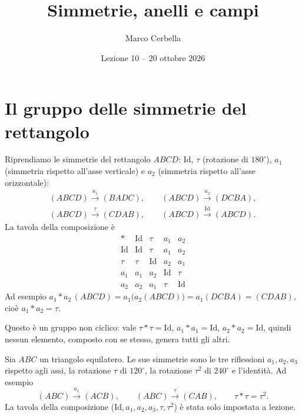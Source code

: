 \documentclass[11pt,a4paper]{article}
\title{Simmetrie, anelli e campi}
\author{Marco Cerbella}
\date{Lezione 10 -- 20 ottobre 2026}
\begin{document}
\maketitle

\section{Il gruppo delle simmetrie del rettangolo}

Riprendiamo le simmetrie del rettangolo $ABCD$: $\mathrm{Id}$, $\tau$ (rotazione di $180^\circ$), $a_1$ (simmetria rispetto all'asse verticale) e $a_2$ (simmetria rispetto all'asse orizzontale):
\[
  \begin{gathered}
  (ABCD) \xrightarrow{a_1} (BADC), \qquad
  (ABCD) \xrightarrow{a_2} (DCBA), \\
  (ABCD) \xrightarrow{\tau} (CDAB), \qquad
  (ABCD) \xrightarrow{\mathrm{Id}} (ABCD).
  \end{gathered}
\]
La tavola della composizione è
\[
\begin{array}{c|cccc}
  * & \mathrm{Id} & \tau & a_1 & a_2 \\ \hline
  \mathrm{Id} & \mathrm{Id} & \tau & a_1 & a_2 \\
  \tau & \tau & \mathrm{Id} & a_2 & a_1 \\
  a_1 & a_1 & a_2 & \mathrm{Id} & \tau \\
  a_2 & a_2 & a_1 & \tau & \mathrm{Id}
\end{array}
\]
Ad esempio $a_1 * a_2\,(ABCD) = a_1\big(a_2(ABCD)\big) = a_1(DCBA) = (CDAB)$, cioè $a_1 * a_2 = \tau$.

\begin{esempio}
Questo è un gruppo non ciclico: vale $\tau * \tau = \mathrm{Id}$, $a_1 * a_1 = \mathrm{Id}$, $a_2 * a_2 = \mathrm{Id}$, quindi nessun elemento, composto con se stesso, genera tutti gli altri.
\end{esempio}

\begin{esempio}
Sia $ABC$ un triangolo equilatero. Le sue simmetrie sono le tre riflessioni $a_1, a_2, a_3$ rispetto agli assi, la rotazione $\tau$ di $120^\circ$, la rotazione $\tau^2$ di $240^\circ$ e l'identità. Ad esempio
\[
  (ABC) \xrightarrow{a_1} (ACB), \qquad (ABC) \xrightarrow{\tau} (CAB), \qquad \tau * \tau = \tau^2 .
\]
La tavola della composizione ($\mathrm{Id}, a_1, a_2, a_3, \tau, \tau^2$) è stata solo impostata a lezione.
\end{esempio}
\end{document}
